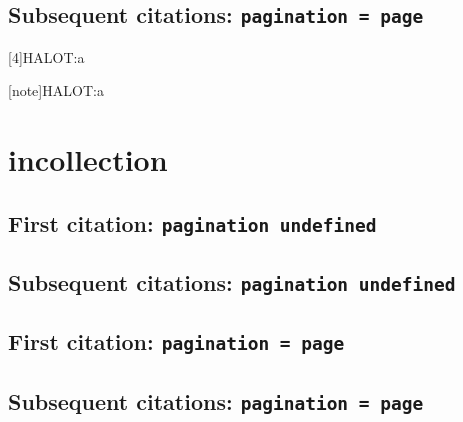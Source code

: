 \documentclass[a4paper]{article}
\begin{document}
\citereset
\cite[note]{HALOT:a}

\subsection{Subsequent citations: \texttt{pagination = page}}

\cite{HALOT:a}

\cite[3:4]{HALOT:a}

\cite[4]{HALOT:a}

[4]{HALOT:a}


[note]{HALOT:a}

\cite[note]{HALOT:a}

\section{incollection}

\subsection{First citation: \texttt{pagination undefined}}

\cite{freedman:1980}

\citereset
\cite[14]{freedman:1980}

\citereset
\cite[note]{freedman:1980}

\subsection{Subsequent citations: \texttt{pagination undefined}}

\cite{freedman:1980}

\cite[14]{freedman:1980}

\cite[note]{freedman:1980}

\subsection{First citation: \texttt{pagination = page}}

\cite{freedman:1980:a}

\citereset
\cite[14]{freedman:1980:a}

\citereset
\cite[note]{freedman:1980:a}

\subsection{Subsequent citations: \texttt{pagination = page}}
\end{document}
